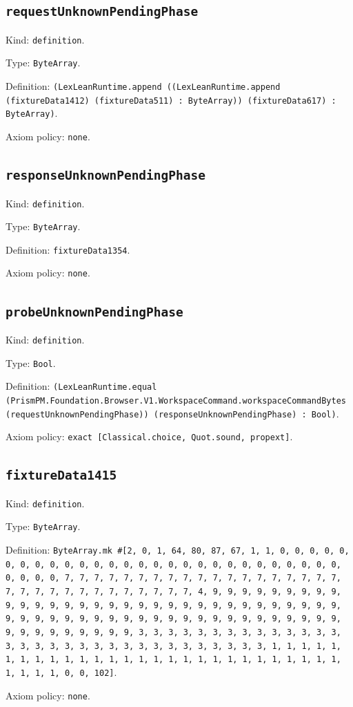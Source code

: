 \documentclass[11pt]{article}
\begin{document}
\subsection*{\texttt{requestUnknownPendingPhase}}
\noindent Kind: \texttt{definition}.\par
\noindent Type: \texttt{ByteArray}.\par
\noindent Definition: \texttt{(LexLeanRuntime.append ((LexLeanRuntime.append (fixtureData1412) (fixtureData511) : ByteArray)) (fixtureData617) : ByteArray)}.\par
\noindent Axiom policy: \texttt{none}.\par
\subsection*{\texttt{responseUnknownPendingPhase}}
\noindent Kind: \texttt{definition}.\par
\noindent Type: \texttt{ByteArray}.\par
\noindent Definition: \texttt{fixtureData1354}.\par
\noindent Axiom policy: \texttt{none}.\par
\subsection*{\texttt{probeUnknownPendingPhase}}
\noindent Kind: \texttt{definition}.\par
\noindent Type: \texttt{Bool}.\par
\noindent Definition: \texttt{(LexLeanRuntime.equal (PrismPM.Foundation.Browser.V1.WorkspaceCommand.workspaceCommandBytes (requestUnknownPendingPhase)) (responseUnknownPendingPhase) : Bool)}.\par
\noindent Axiom policy: \texttt{exact [Classical.choice, Quot.sound, propext]}.\par
\subsection*{\texttt{fixtureData1415}}
\noindent Kind: \texttt{definition}.\par
\noindent Type: \texttt{ByteArray}.\par
\noindent Definition: \texttt{ByteArray.mk \#[2, 0, 1, 64, 80, 87, 67, 1, 1, 0, 0, 0, 0, 0, 0, 0, 0, 0, 0, 0, 0, 0, 0, 0, 0, 0, 0, 0, 0, 0, 0, 0, 0, 0, 0, 0, 0, 0, 0, 0, 0, 7, 7, 7, 7, 7, 7, 7, 7, 7, 7, 7, 7, 7, 7, 7, 7, 7, 7, 7, 7, 7, 7, 7, 7, 7, 7, 7, 7, 7, 7, 7, 7, 4, 9, 9, 9, 9, 9, 9, 9, 9, 9, 9, 9, 9, 9, 9, 9, 9, 9, 9, 9, 9, 9, 9, 9, 9, 9, 9, 9, 9, 9, 9, 9, 9, 9, 9, 9, 9, 9, 9, 9, 9, 9, 9, 9, 9, 9, 9, 9, 9, 9, 9, 9, 9, 9, 9, 9, 9, 9, 9, 9, 9, 9, 9, 9, 9, 3, 3, 3, 3, 3, 3, 3, 3, 3, 3, 3, 3, 3, 3, 3, 3, 3, 3, 3, 3, 3, 3, 3, 3, 3, 3, 3, 3, 3, 3, 3, 3, 1, 1, 1, 1, 1, 1, 1, 1, 1, 1, 1, 1, 1, 1, 1, 1, 1, 1, 1, 1, 1, 1, 1, 1, 1, 1, 1, 1, 1, 1, 1, 1, 0, 0, 102]}.\par
\noindent Axiom policy: \texttt{none}.\par
\end{document}
